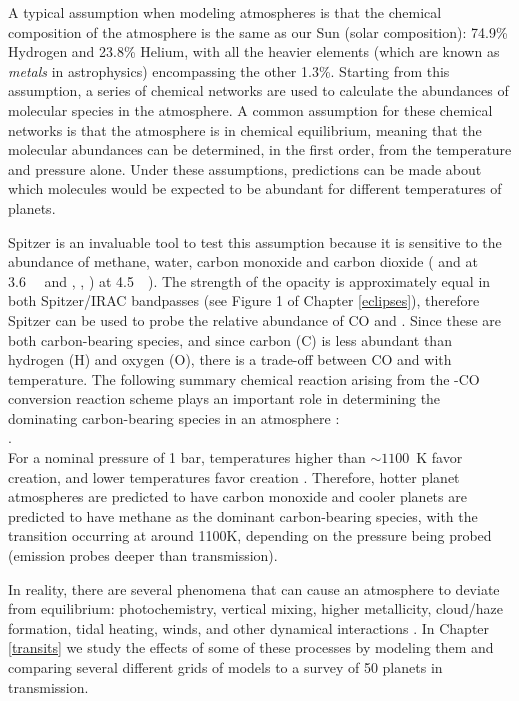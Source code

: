 A typical assumption when modeling atmospheres is that the chemical composition of the atmosphere is  the same as our Sun (solar composition): 74.9\% Hydrogen and 23.8\% Helium, with all the heavier elements (which are known as \textit{metals} in astrophysics) encompassing the other 1.3\%. Starting from this assumption, a series of chemical networks are used to calculate the abundances of molecular species in the atmosphere. A common assumption for these chemical networks is that the atmosphere is in chemical equilibrium, meaning that the molecular abundances can be determined, in the first order, from the temperature and pressure alone. Under these assumptions, predictions can be made about which molecules would be expected to be abundant for different temperatures of planets.

Spitzer is an invaluable tool to test this assumption because it is sensitive to the abundance of methane, water, carbon monoxide and carbon dioxide ( and  at 3.6~\um~ and , , ) at 4.5~\um~). The strength of the  opacity is approximately equal in both Spitzer/IRAC bandpasses (see Figure 1 of Chapter \ref{eclipses}), therefore Spitzer can be used to probe the relative abundance of CO and  \citep{Madhusudhan2019}. Since these are both carbon-bearing species, and since carbon (C) is less abundant than hydrogen (H) and oxygen (O), there is a trade-off between CO and  with temperature. The following summary chemical reaction arising from the -CO conversion reaction scheme plays an important role in determining the dominating carbon-bearing species in an atmosphere \citep[e.g.,][]{Visscher2010, Moses2011, Visscher2011}:
\\
.
\\
For a nominal pressure of 1 bar, temperatures higher than $\sim1100$~K favor  creation, and lower temperatures favor  creation \citep[e.g.][]{Madhusudhan2012, Molliere2015, Molaverdikhani2019}. Therefore, hotter planet atmospheres are predicted to have carbon monoxide and cooler planets are predicted to have methane as the dominant carbon-bearing species, with the transition occurring at around 1100K, depending on the pressure being probed (emission probes deeper than transmission).

In reality, there are several phenomena that can cause an atmosphere to deviate from equilibrium: photochemistry, vertical mixing, higher metallicity, cloud/haze formation, tidal heating, winds, and other dynamical interactions \citep[e.g.,][]{Madhusudhan2019}. In Chapter \ref{transits} we study the effects of some of these processes by modeling them and comparing several different grids of models to a survey of 50 planets in transmission.

